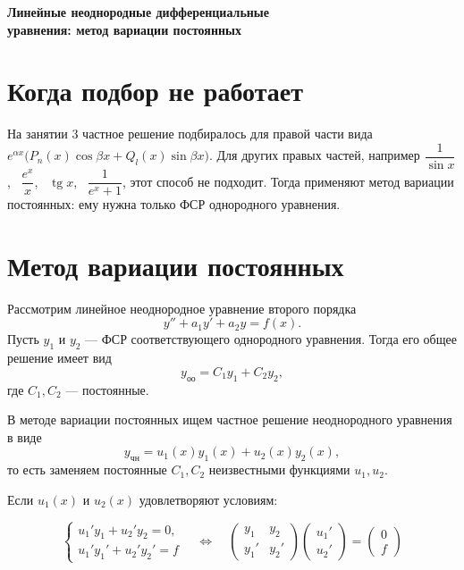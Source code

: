 \documentclass[11pt,a4paper]{article}
\newcommand{\yoo}{y_{\text{оо}}}
\newcommand{\ych}{y_{\text{чн}}}
\newcommand{\tgn}{\operatorname{tg}}
\begin{document}
\begin{center}
{\LARGE\bfseries  Линейные неоднородные дифференциальные \\[2pt]
                  уравнения: метод вариации постоянных }
\end{center}


\section*{Когда подбор не работает}

На занятии 3 частное решение подбиралось для правой части вида $e^{\alpha x}\bigl(P_n(x)\cos\beta x + Q_l(x)\sin\beta x\bigr)$. Для других правых частей, например $\dfrac{1}{\sin x}$, \ $\dfrac{e^{x}}{x}$, \ $\tgn x$, \ $\dfrac{1}{e^{x} + 1}$, этот способ не подходит. Тогда применяют метод вариации постоянных: ему нужна только ФСР однородного уравнения.

\section*{Метод вариации постоянных}

Рассмотрим линейное неоднородное уравнение второго порядка
\[
  y'' + a_1 y' + a_2 y = f(x).
\]
Пусть $y_1$ и $y_2$ --- ФСР соответствующего однородного уравнения. Тогда его общее решение имеет вид
\[
  \yoo = C_1 y_1 + C_2 y_2,
\]
где $C_1,C_2$ --- постоянные. 

В методе вариации постоянных ищем частное решение неоднородного уравнения в виде
\[
  \ych = u_1(x)y_1(x) + u_2(x)y_2(x),
\]
то есть заменяем постоянные $C_1,C_2$ неизвестными функциями $u_1,u_2$.

Если $u_1(x)$ и $u_2(x)$ удовлетворяют условиям:

\[
  \begin{cases}
    u_1'y_1 + u_2'y_2 = 0,\\
    u_1'y_1' + u_2'y_2' = f
  \end{cases}
  \quad\Longleftrightarrow\quad
  \begin{pmatrix} y_1 & y_2 \\ y_1' & y_2' \end{pmatrix}
  \begin{pmatrix} u_1' \\ u_2' \end{pmatrix}
  = \begin{pmatrix} 0 \\ f \end{pmatrix}
\]
\end{document}
